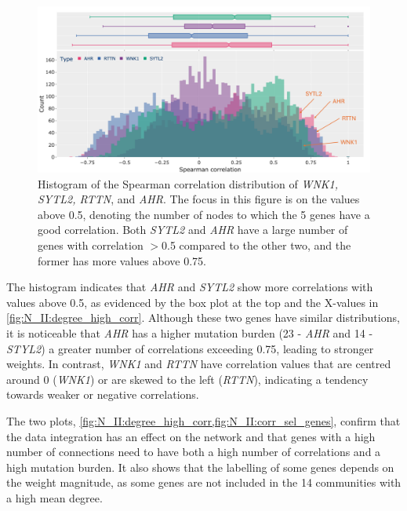 \begin{figure}[!b]    
    \centering
    \includegraphics[width=1.0\textwidth,height=1.0\textheight,keepaspectratio]{Sections/Network_II/resources/reward/hist_corr_labels.png}
    \caption[Distribution of Spearman for a few genes]{Histogram of the Spearman correlation distribution of \textit{WNK1, SYTL2, RTTN}, and \textit{AHR}. The focus in this figure is on the values above 0.5, denoting the number of nodes to which the 5 genes have a good correlation. Both \textit{SYTL2} and \textit{AHR} have a large number of genes with correlation $>$0.5 compared to the other two, and the former has more values above 0.75. }
    \label{fig:N_II:corr_sel_genes}
\end{figure}


The histogram indicates that \textit{AHR} and \textit{SYTL2} show more correlations with values above 0.5, as evidenced by the box plot at the top and the X-values in \cref{fig:N_II:degree_high_corr}. Although these two genes have similar distributions, it is noticeable that \textit{AHR} has a higher mutation burden (23 - \textit{AHR} and 14 - \textit{STYL2}) a greater number of correlations exceeding 0.75, leading to stronger weights. In contrast, \textit{WNK1} and \textit{RTTN} have correlation values that are centred around 0 (\textit{WNK1}) or are skewed to the left (\textit{RTTN}), indicating a tendency towards weaker or negative correlations.

The two plots, \cref{fig:N_II:degree_high_corr,fig:N_II:corr_sel_genes}, confirm that the data integration has an effect on the network and that genes with a high number of connections need to have both a high number of correlations and a high mutation burden. It also shows that the labelling of some genes depends on the weight magnitude, as some genes are not included in the 14 communities with a high mean degree.




